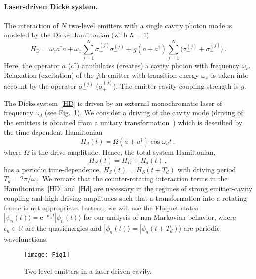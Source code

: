 \documentclass[aps,pra,twocolumn,showpacs,showkeys,10pt,nofootinbib]{revtex4-1}
\newcommand{\rme}{\mathrm e}
\newcommand{\rmi}{\mathrm i}
\begin{document}
\paragraph*{Laser-driven Dicke system.}
The interaction of $N$ two-level emitters with a single cavity photon mode is modeled by the Dicke Hamiltonian (with $\hbar=1$)~\cite{dic54}
\begin{equation}\label{HD}
  H_D = \omega_c a^\dagger a + \omega_x \sum_{j=1}^N \sigma_+^{(j)} \sigma_-^{(j)} + g (a + a^\dagger) \sum_{j=1}^N \big( \sigma_-^{(j)} + \sigma_+^{(j)} \big) \,.
\end{equation}
Here, the operator $a$ ($a^\dagger$) annihilates (creates) a cavity photon with frequency $\omega_c$.
Relaxation (excitation) of the $j$th emitter with transition energy $\omega_x$ is taken into account by the operator $\sigma_-^{(j)}$ ($\sigma_+^{(j)}$).
The emitter-cavity coupling strength is $g$.

The Dicke system~\eqref{HD} is driven by an external monochromatic laser of frequency $\omega_d$ (see Fig.~\ref{fig:cavity}).
We consider a driving of the cavity mode (driving of the emitters is obtained from a unitary transformation~\cite{ac91}) which is described by the time-dependent Hamiltonian
\begin{equation}\label{Hd}
  H_d(t) = \Omega (a + a^\dagger) \cos \omega_d t \,,
\end{equation}
where $\Omega$ is the drive amplitude.
Hence, the total system Hamiltonian,
\begin{equation}
  H_S(t) = H_D + H_d(t) \,,
\end{equation}
has a periodic time-dependence, $H_S(t)=H_S(t+T_d)$ with driving period $T_d=2\pi/\omega_d$.
We remark that the counter-rotating interaction terms in the Hamiltonians~\eqref{HD} and~\eqref{Hd} are necessary in the regimes of strong emitter-cavity coupling and high driving amplitudes such that a transformation into a rotating frame is not appropriate.
Instead, we will use the Floquet states~\cite{flo83} $|\psi_n(t)\rangle=\rme^{-\rmi\epsilon_nt}|\phi_n(t)\rangle$ for our analysis of non-Markovian behavior, where $\epsilon_n\in\mathbb{R}$ are the quasienergies and $|\phi_n(t)\rangle=|\phi_n(t+T_d)\rangle$ are periodic wavefunctions.

\begin{figure}
  \texttt{[image: Fig1]}
  \caption{\label{fig:cavity} Two-level emitters in a laser-driven cavity.}
\end{figure}
\end{document}
